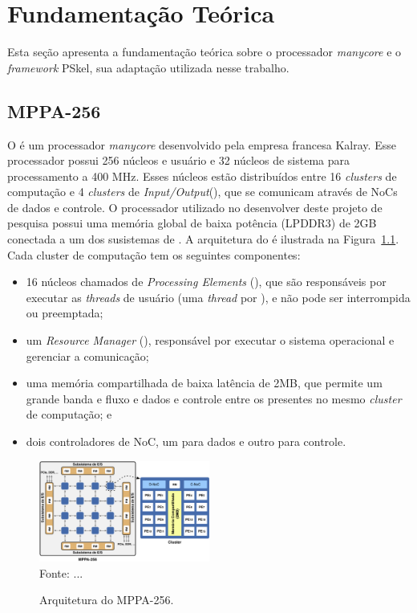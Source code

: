 \chapter[Fundamentação Teórica]{Fundamentação Teórica}

Esta seção apresenta a fundamentação teórica sobre o processador \textit{manycore} \mppa e o \textit{framework} PSkel, sua adaptação utilizada nesse trabalho.

\section{MPPA-256}
\label{subsec:mppa}

O \mppa é um processador \textit{manycore} desenvolvido pela empresa francesa
Kalray. Esse processador possui 256 núcleos e usuário e 32 núcleos de sistema para processamento a 400 MHz. Esses núcleos estão distribuídos entre 16 \textit{clusters} de computação e 4 \textit{clusters} de \textit{Input/Output}(\io), que se comunicam através de NoCs de dados e controle. O processador utilizado no desenvolver deste projeto de pesquisa possui uma memória global de baixa potência (LPDDR3) de 2GB conectada a um dos susistemas de \io. A arquitetura do \mppa é ilustrada na Figura~\ref{fig:mppaOverall}. Cada cluster de computação tem os seguintes componentes:

\begin{itemize}
    \item 16 núcleos chamados de \textit{Processing Elements} (\pes), que são responsáveis por executar as \textit{threads} de usuário (uma \textit{thread} por \pe), e não pode ser interrompida ou preemptada;
    
    \item um \textit{Resource Manager} (\rman), responsável por executar o sistema operacional e gerenciar a comunicação;
    
    \item uma memória compartilhada de baixa latência de 2MB, que permite um grande banda e fluxo e dados e controle entre os \pes presentes no mesmo \textit{cluster} de computação; e
    
    \item dois controladores de NoC, um para dados e outro para controle.
    
\end{itemize}

\begin{figure}
    \centering
    \caption{Arquitetura do MPPA-256.}
    \includegraphics[width=0.5\textwidth]{figs/mppa-overview.pdf} \\
    Fonte: ...
    \label{fig:mppaOverall}
\end{figure}

